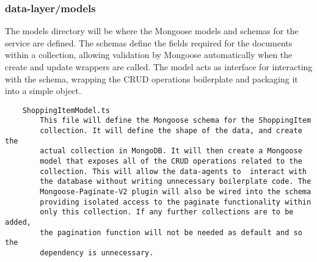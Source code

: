 \subsubsection{data-layer/models}
The models directory will be where the Mongoose models and schemas for the service are defined. The schemas define the fields required for the documents within a collection, allowing validation by Mongoose automatically when the create and update wrappers are called. The model acts as interface for interacting with the schema, wrapping the CRUD operations boilerplate and packaging it into a simple object.  
\begin{verbatim}
    ShoppingItemModel.ts
        This file will define the Mongoose schema for the ShoppingItem 
        collection. It will define the shape of the data, and create the
        actual collection in MongoDB. It will then create a Mongoose 
        model that exposes all of the CRUD operations related to the 
        collection. This will allow the data-agents to  interact with
        the database without writing unnecessary boilerplate code. The
        Mongoose-Paginate-V2 plugin will also be wired into the schema 
        providing isolated access to the paginate functionality within
        only this collection. If any further collections are to be added,
        the pagination function will not be needed as default and so the
        dependency is unnecessary.
\end{verbatim}
